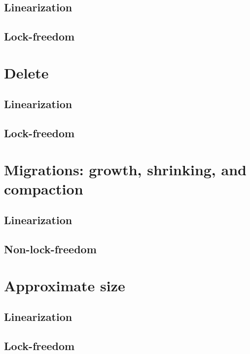 \subsection{Linearization}
\subsection{Lock-freedom}

\section{Delete}\label{sec:delete}



\subsection{Linearization}
\subsection{Lock-freedom}

\section{Migrations: growth, shrinking, and compaction}\label{sec:migrations}

\subsection{Linearization}
\subsection{Non-lock-freedom}

\section{Approximate size}\label{sec:approximate-size}

\subsection{Linearization}
\subsection{Lock-freedom}

